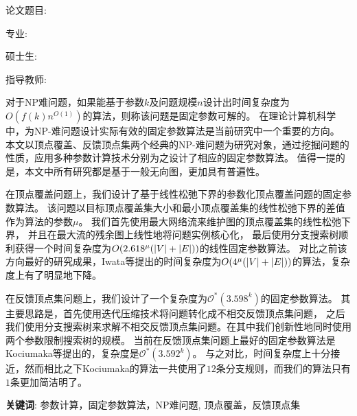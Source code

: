 ﻿

\setcounter{page}{1}
\renewcommand{\thepage}{\Roman{page}}
\setlength{\parindent}{0em}
论文题目: \,\ctitle

专\hspace{2em}业: \,\major

硕\hspace{0.5em}士\hspace{0.5em}生: \,\cauthor

指导教师: \,\supervisor
\setlength{\parindent}{2em}

\vspace{1.2cm}
 \centerline{}
\vspace{0.3cm}
对于NP难问题，如果能基于参数$k$及问题规模$n$设计出时间复杂度为$O(f(k)n^{O(1)})$的算法，则称该问题是固定参数可解的。
在理论计算机科学中，为NP-难问题设计实际有效的固定参数算法是当前研究中一个重要的方向。
本文以顶点覆盖、反馈顶点集两个经典的NP-难问题为研究对象，通过挖掘问题的性质，应用多种参数计算技术分别为之设计了相应的固定参数算法。
值得一提的是，本文中所有研究都是基于一般无向图，更加具有普遍性。

在顶点覆盖问题上，我们设计了基于线性松弛下界的参数化顶点覆盖问题的固定参数算法。
该问题以目标顶点覆盖集大小和最小顶点覆盖集的线性松弛下界的差值作为算法的参数$\mu$。
我们首先使用最大网络流来维护图的顶点覆盖集的线性松弛下界，
并且在最大流的残余图上线性地将问题实例核心化，
最后使用分支搜索树顺利获得一个时间复杂度为$O(2.618^\mu(\left\vert V \right\vert + \left\vert E \right\vert))$的线性固定参数算法。
对比之前该方向最好的研究成果，Iwata等提出的时间复杂度为$O(4^\mu(\left\vert V \right\vert + \left\vert E \right\vert))$的算法，复杂度上有了明显地下降。

在反馈顶点集问题上，我们设计了一个复杂度为$\mathcal{O}^*(3.598^k)$的固定参数算法。
其主要思路是，首先使用迭代压缩技术将问题转化成不相交反馈顶点集问题，
之后我们使用分支搜索树来求解不相交反馈顶点集问题。在其中我们创新性地同时使用两个参数限制搜索树的规模。
当前在反馈顶点集问题上最好的固定参数算法是Kociumaka等提出的，复杂度是$\mathcal{O}^*(3.592^k)$。
与之对比，时间复杂度上十分接近，然而相比之下Kociumaka的算法一共使用了$12$条分支规则，而我们的算法只有$1$条更加简洁明了。

\vspace{1cm}

{\noindent\hei \textbf{关键词}}: {参数计算，固定参数算法，NP难问题, 顶点覆盖，反馈顶点集}

